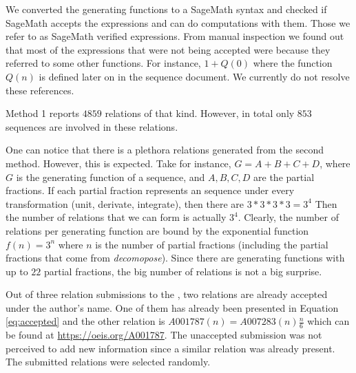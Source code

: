 We converted the generating functions to a SageMath syntax and checked if SageMath accepts the expressions and can do
 computations with them. Those we refer to as SageMath verified expressions. From manual inspection we found out that
  most of the expressions that were not being accepted were because they referred to some other functions. For
  instance, $1+Q(0)$ where the function $Q(n)$ is defined later on in the sequence document. We currently do not
  resolve these references.

Method 1 reports $4859$ relations of that kind. However, in total only $853$ sequences are involved in these relations.

One can notice that there is a plethora relations generated from the second method. However, this is expected.
Take for instance, $G = A + B + C + D$, where $G$ is the generating function of a sequence, and $A,B,C, D$ are the
partial fractions. If each partial fraction represents an \oeis sequence under every transformation (unit, derivate,
integrate), then there are $3*3*3*3=3^4$ Then the number of relations that we can form is actually $3^4$. Clearly,
the number of relations per generating function are bound by the exponential function $f(n) = 3^n$ where $n$ is the 
number of partial fractions (including the partial fractions that come from \emph{decomopose}). Since there are generating functions
with up to $22$ partial fractions, the big number of relations is not a big surprise.

Out of three relation submissions to the \oeis, two relations are already accepted
\cite{oeis-accepted-1,oeis-accepted-2} under the author's name. One of them has already
been presented in Equation \ref{eq:accepted} and the other relation is
$A001787(n) = A007283(n) \frac{n}{6}$ which can be found at
\url{https://oeis.org/A001787}. The unaccepted submission was not perceived to add new
information since a similar relation was already present. The submitted relations were
selected randomly.

